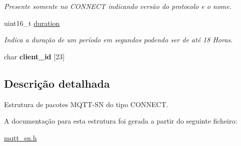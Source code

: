 \begin{DoxyCompactItemize}
\begin{DoxyCompactList}\small\item\em Presente somente no C\+O\+N\+N\+E\+C\+T indicando versão do protocolo e o nome. \end{DoxyCompactList}\item 
\hypertarget{structconnect__packet__t_a71f530f1f32dbca56a6af8a5fbbfbe49}{uint16\+\_\+t \hyperlink{structconnect__packet__t_a71f530f1f32dbca56a6af8a5fbbfbe49}{duration}}\label{structconnect__packet__t_a71f530f1f32dbca56a6af8a5fbbfbe49}

\begin{DoxyCompactList}\small\item\em Indica a duração de um período em segundos podendo ser de até 18 Horas. \end{DoxyCompactList}\item 
\hypertarget{structconnect__packet__t_a4616f81d6902f21aa47ea49dd3d5fdce}{char {\bfseries client\+\_\+id} \mbox{[}23\mbox{]}}\label{structconnect__packet__t_a4616f81d6902f21aa47ea49dd3d5fdce}

\end{DoxyCompactItemize}


\subsection{Descrição detalhada}
Estrutura de pacotes M\+Q\+T\+T-\/\+S\+N do tipo C\+O\+N\+N\+E\+C\+T. 

A documentação para esta estrutura foi gerada a partir do seguinte ficheiro\+:\begin{DoxyCompactItemize}
\item 
\hyperlink{mqtt__sn_8h}{mqtt\+\_\+sn.\+h}\end{DoxyCompactItemize}
